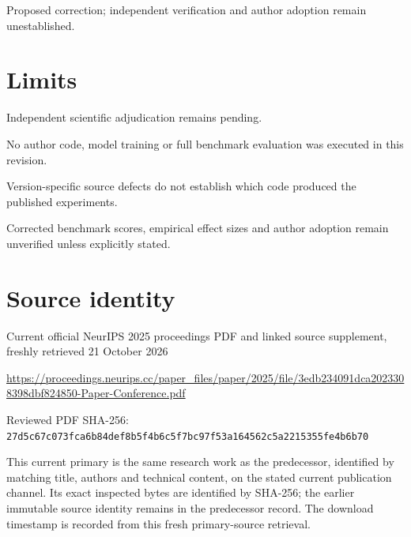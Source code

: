 \documentclass[11pt]{article}
\begin{document}
Proposed correction; independent verification and author adoption remain unestablished.

\section*{Limits}

Independent scientific adjudication remains pending.\par

No author code, model training or full benchmark evaluation was executed in this revision.\par

Version-specific source defects do not establish which code produced the published experiments.\par

Corrected benchmark scores, empirical effect sizes and author adoption remain unverified unless explicitly stated.\par

\section*{Source identity}

Current official NeurIPS 2025 proceedings PDF and linked source supplement, freshly retrieved 21 October 2026

\url{https://proceedings.neurips.cc/paper_files/paper/2025/file/3edb234091dca2023308398dbf824850-Paper-Conference.pdf}

Reviewed PDF SHA-256: \nolinkurl{27d5c67c073fca6b84def8b5f4b6c5f7bc97f53a164562c5a2215355fe4b6b70}

This current primary is the same research work as the predecessor, identified by matching title, authors and technical content, on the stated current publication channel. Its exact inspected bytes are identified by SHA-256; the earlier immutable source identity remains in the predecessor record. The download timestamp is recorded from this fresh primary-source retrieval.
\end{document}
